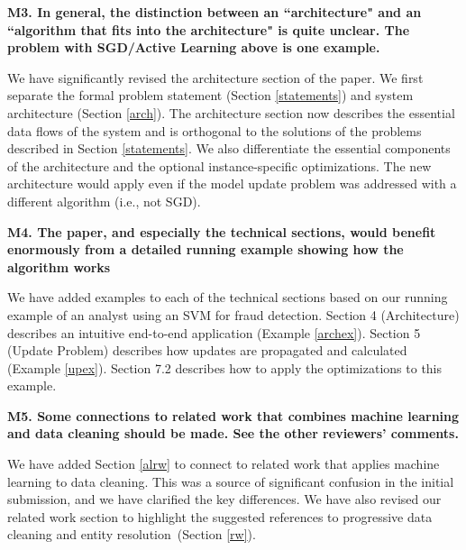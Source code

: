 \vspace{0.5em}

\noindent\textbf{M3. In general, the distinction between an ``architecture" and an ``algorithm that fits into the architecture" is quite unclear. The problem with SGD/Active Learning above is one example.}

We have significantly revised the architecture section of the paper.
We first separate the formal problem statement (Section \ref{statements}) and system architecture (Section \ref{arch}).
The architecture section now describes the essential data flows of the system and is orthogonal to the solutions of the problems described in Section \ref{statements}.
We also differentiate the essential components of the architecture and the optional instance-specific optimizations.
The new architecture would apply even if the model update problem was addressed with a different algorithm (i.e., not SGD).

\vspace{0.5em}

\noindent\textbf{M4. The paper, and especially the technical sections, would benefit enormously from a detailed running example showing how the algorithm works}

We have added examples to each of the technical sections based on our running example of an analyst using an SVM for fraud detection. 
Section 4 (Architecture) describes an intuitive end-to-end application (Example \ref{archex}).
Section 5 (Update Problem) describes how updates are propagated and calculated (Example \ref{upex}).
Section 7.2 describes how to apply the optimizations to this example.

\vspace{0.5em}

\noindent\textbf{M5. Some connections to related work that combines machine learning and data cleaning should be made. See the other reviewers' comments.}

We have added Section \ref{alrw} to connect \sys to related work that applies machine learning to data cleaning.
This was a source of significant confusion in the initial submission, and we have clarified the key differences.
We have also revised our related work section to highlight the suggested references to progressive data cleaning and entity resolution~(Section \ref{rw}).

